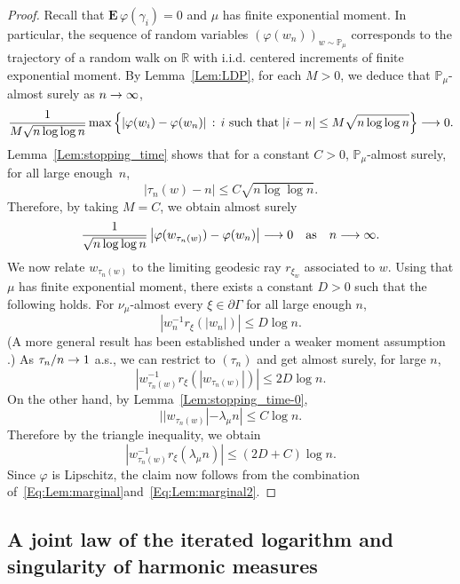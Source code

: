 \documentclass[AHL,Unicode,longabstracts,published]{cedram}
\newcommand{\f}{\varphi}
\newcommand{\R}{\mathbb{R}}
\renewcommand{\Pr}{\mathbb{P}}
\newcommand{\Eb}{\mathbf{E}\,}
\renewcommand{\(}{\left(}
\renewcommand{\)}{\right)}
\renewcommand*{\to}{\mathchoice{\longrightarrow}{\rightarrow}{\rightarrow}{\rightarrow}}
\begin{document}
\begin{proof}
Recall that $\Eb \f(\gamma_i)=0$ and $\mu$ has finite exponential moment. In particular, the sequence of random variables $(\varphi(w_{n}))_{w\sim \Pr_{\mu}}$ corresponds to the trajectory of a random walk on $\R$ with i.i.d. centered increments of finite exponential moment. By Lemma~\ref{Lem:LDP}, for each $M>0$, we deduce that $\Pr_{\mu}$-almost surely as $n \to \infty$,
\[
\frac{1}{M\sqrt{n\log \log n}}\max\left\{|\f(w_i)-\f(w_n)| \, : \, \text{$i$ such that}\;|i-n|\le M\sqrt{n\log \log n}\right\}\to 0.
\]
Lemma~\ref{Lem:stopping_time} shows that for a constant $C> 0$, $\Pr_{\mu}$-almost surely, for all large enough~$n$,
\[
|\tau_n(w)-n|\le C\sqrt{n\log \log n}.
\]
Therefore, by taking $M=C$, we obtain almost surely
\begin{equation}\label{Eq:Lem:marginal}
\frac{1}{\sqrt{n\log \log n}}\left|\f(w_{\tau_n(w)})-\f(w_n)\right| \to 0 \quad \text{as}\quad n \to \infty.
\end{equation}
We now relate $w_{\tau_n(w)}$ to the limiting geodesic ray $r_{\xi_{w}}$ associated to $w$. Using that $\mu$ has finite exponential moment, there exists a constant $D>0$ such that the following holds. For $\nu_\mu$-almost every $\xi \in \partial \Gamma$ for all large enough $n$,
\[
\left|w_n^{-1} r_\xi(|w_{n}|)\right| \le D \log n.
\]
(A more general result has been established under a weaker moment assumption \cite[Theorem~D]{ChoiCLT}.) As $\tau_{n}/n\to 1$ a.s., we can restrict to $(\tau_{n})$ and get almost surely, for large $n$,
\[
\left|w_{\tau_{n}(w)}^{-1} r_\xi(|w_{{\tau_{n}(w)}}|)\right| \le 2 D \log n.
\]
On the other hand, by Lemma~\ref{Lem:stopping_time-0},
\[
||w_{{\tau_{n}(w)}}| -\lambda_\mu n| \leq C \log n.
\]
Therefore by the triangle inequality, we obtain
\begin{equation}\label{Eq:Lem:marginal2}
\left|w_{\tau_{n}(w)}^{-1} r_\xi(\lambda_\mu n)\right| \le (2 D+C) \log n.
\end{equation}
Since $\varphi$ is Lipschitz, the claim now follows from the combination of~\eqref{Eq:Lem:marginal}\linebreak and~\eqref{Eq:Lem:marginal2}.
\end{proof}



\subsection{A joint law of the iterated logarithm and singularity of harmonic measures}
\end{document}
